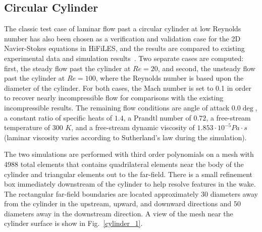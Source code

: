 \graphicspath{{figures_cylinder/}}%

\subsection{Circular Cylinder}

The classic test case of laminar flow past a circular cylinder at low Reynolds number has also been chosen as a verification and validation case for the 2D Navier-Stokes equations in HiFiLES, and the results are compared to existing experimental data and simulation results~\cite{park1998}. Two separate cases are computed: first, the steady flow past the cylinder at $Re = 20$, and second, the unsteady flow past the cylinder at $Re = 100$, where the Reynolds number is based upon the diameter of the cylinder. For both cases, the Mach number is set to 0.1 in order to recover nearly incompressible flow for comparisons with the existing incompressible results. The remaining flow conditions are angle of attack $0.0\deg$, a constant ratio of specific heats of $1.4$, a Prandtl number of $0.72$, a free-stream temperature of 300 $K$, and a free-stream dynamic viscosity of $1.853\cdot 10^{-5} Pa \cdot s$ (laminar viscosity varies according to Sutherland's law during the simulation).

The two simulations are performed with third order polynomials on a mesh with 4988 total elements that contains quadrilateral elements near the body of the cylinder and triangular elements out to the far-field. There is a small refinement box immediately downstream of the cylinder to help resolve features in the wake. The rectangular far-field boundaries are located approximately 30 diameters away from the cylinder in the upstream, upward, and downward directions and 50 diameters away in the downstream direction. A view of the mesh near the cylinder surface is show in Fig.~\ref{cylinder_1}.

